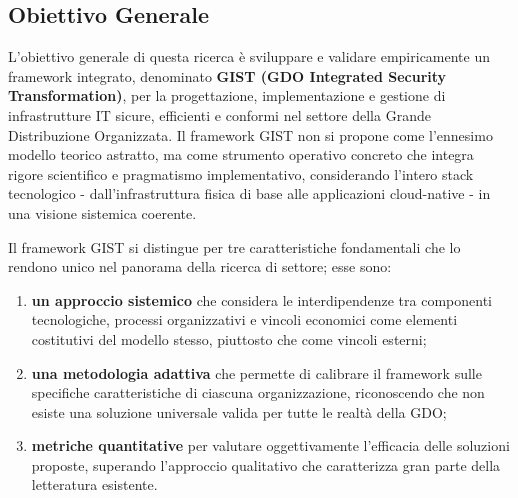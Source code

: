 \subsection{Obiettivo Generale}

L'obiettivo generale di questa ricerca è sviluppare e validare empiricamente un framework integrato, denominato \textbf{GIST (GDO Integrated Security Transformation)}, per la progettazione, implementazione e gestione di infrastrutture IT sicure, efficienti e conformi nel settore della Grande Distribuzione Organizzata. Il framework GIST non si propone come l'ennesimo modello teorico astratto, ma come strumento operativo concreto che integra rigore scientifico e pragmatismo implementativo, considerando l'intero stack tecnologico - dall'infrastruttura fisica di base alle applicazioni cloud-native - in una visione sistemica coerente.

Il framework GIST si distingue per tre caratteristiche fondamentali che lo rendono unico nel panorama della ricerca di settore; esse sono: 
\begin{enumerate}
    \item  \textbf{un approccio sistemico} che considera le interdipendenze tra componenti tecnologiche, processi organizzativi e vincoli economici come elementi costitutivi del modello stesso, piuttosto che come vincoli esterni;
    \item \textbf{una metodologia adattiva} che permette di calibrare il framework sulle specifiche caratteristiche di ciascuna organizzazione, riconoscendo che non esiste una soluzione universale valida per tutte le realtà della GDO; 
    \item \textbf{metriche quantitative} per valutare oggettivamente l'efficacia delle soluzioni proposte, superando l'approccio qualitativo che caratterizza gran parte della letteratura esistente.
\end{enumerate}


